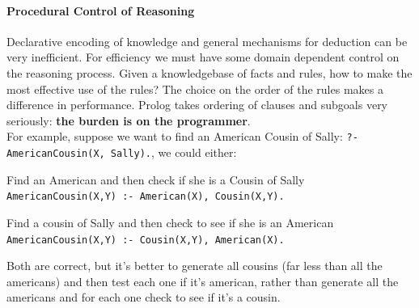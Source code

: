 \documentclass[10pt]{report}
\begin{document}
\paragraph{Procedural Control of Reasoning} Declarative encoding of knowledge and general mechanisms for deduction can be very inefficient. For efficiency we must have some domain dependent control on the reasoning process. Given a knowledgebase of facts and rules, how to make the most effective use of the rules? The choice on the order of the rules makes a difference in performance. Prolog takes ordering of clauses and subgoals very seriously: \textbf{the burden is on the programmer}.\\
For example, suppose we want to find an American Cousin of Sally: \texttt{?- AmericanCousin(X, Sally).}, we could either:
\begin{list}{}{}
	\item Find an American and then check if she is a Cousin of Sally\\\texttt{AmericanCousin(X,Y) :- American(X), Cousin(X,Y).}
	\item Find a cousin of Sally and then check to see if she is an American\\\texttt{AmericanCousin(X,Y) :- Cousin(X,Y), American(X).}
\end{list}
Both are correct, but it's better to generate all cousins (far less than all the americans) and then test each one if it's american, rather than generate all the americans and for each one check to see if it's a cousin.
\end{document}
